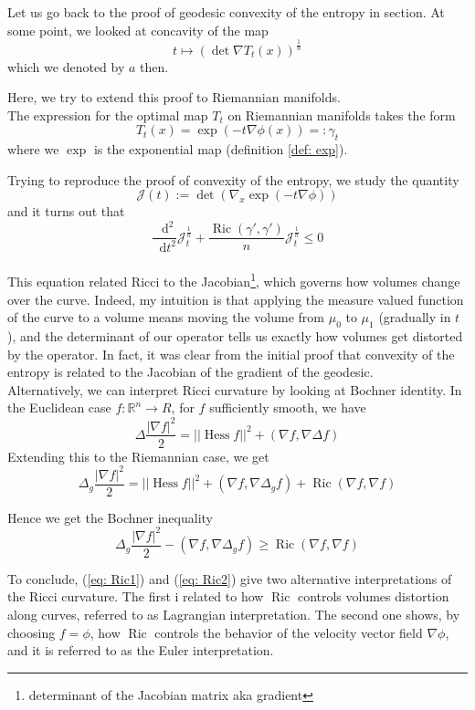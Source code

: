 \documentclass[a4paper,12pt,reqno]{amsbook}
\theoremstyle{definition} %
\newcommand*\de{\mathop{}\!\mathrm{d}}
\newcommand{\1}{\mathbbm{1}}
\newcommand{\R}{\ensuremath{\mathbb{R}}}
\DeclareMathOperator{\Ric}{Ric}
\def\Hess{\mathop{\mathrm{Hess}}\nolimits}
\def\Ric{\mathop{\mathrm{Ric}}\nolimits}
\theoremstyle{plain}
\theoremstyle{remark}
\begin{document}
{Let us go back to the proof of geodesic convexity of the entropy in section. At some point, we looked at concavity of the map
\[
t \mapsto (\det \nabla T_t(x))^{\frac{1}{n}}
\]
which we denoted by $a$ then.

Here, we try to extend this proof to Riemannian manifolds.
\\

The expression for the optimal map $T_t$ on Riemannian manifolds takes the form
\[
T_t(x) = \exp(-t \nabla \phi(x)) =: \gamma_t
\]
where we $\exp$ is the exponential map (definition \ref{def: exp}). 

Trying to reproduce the proof of convexity of the entropy, we study the quantity 
\[
\mathscr{J}(t) := \det (\nabla_x\exp(-t \nabla \phi))
\]
and it turns out that 
\begin{equation}\label{eq: Ric1}
    \frac{\de^2}{\de{t^2}} \mathscr{J}^{\frac{1}{n}}_t + \frac{\Ric(\gamma',\gamma')}{n}\mathscr{J}^{\frac{1}{n}}_t  \le 0
\end{equation}
\\

This equation related Ricci to the Jacobian\footnote{determinant of the Jacobian matrix aka gradient}, which governs how volumes change over the curve. Indeed, my intuition is that applying the measure valued function of the curve to a volume means moving the volume from $\mu_0$ to $\mu_1$ (gradually in $t$), and the determinant of our operator tells us exactly how volumes get distorted by the operator. In fact, it was clear from the initial proof that convexity of the entropy is related to the Jacobian of the gradient of the geodesic.  
\\

Alternatively, we can interpret Ricci curvature by looking at Bochner identity.
In the Euclidean case $f:\R^n \to R$, for $f$ sufficiently smooth, we have
\[
\Delta \frac{|\nabla f|^2}{2} = || \Hess f||^2 + (\nabla f, \nabla \Delta f)
\]
Extending this to the Riemannian case, we get 
\[
\Delta_g \frac{|\nabla f|^2}{2} = || \Hess f||^2 + (\nabla f, \nabla \Delta_g f) + \Ric(\nabla f, \nabla f)
\]

Hence we get the Bochner inequality
\begin{equation}\label{eq: Ric2}
    \Delta_g \frac{|\nabla f|^2}{2} - (\nabla f, \nabla \Delta_g f) \ge \Ric(\nabla f, \nabla f)
\end{equation}

To conclude, (\ref{eq: Ric1}) and (\ref{eq: Ric2}) give two alternative interpretations of the Ricci curvature. The first i related to how $\Ric$ controls volumes distortion along curves, referred to as Lagrangian interpretation. The second one shows, by choosing $f=\phi$, how $\Ric$ controls the behavior of the velocity vector field $\nabla \phi$, and it is referred to as the Euler interpretation. 
\\

}
\end{document}
